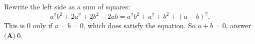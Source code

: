 Rewrite the left side as a sum of squares:
\[a^2b^2+2a^2+2b^2-2ab=a^2b^2+a^2+b^2+(a-b)^2.\]
This is $0$ only if $a=b=0$, which does satisfy the equation. So $a+b=0$, answer $\boxed{\textbf{(A)}\ 0}$.
